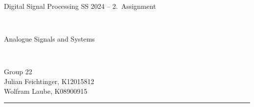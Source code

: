 \documentclass[12pt,a4paper,austrian]{article}
\begin{document}
\pagestyle{plain}


\thispagestyle{empty}
\noindent
\begin{minipage}[b][4cm]{1.0\textwidth}  
\begin{center}
\begin{bf} 
\begin{large} Digital Signal Processing SS 2024 -- 2.~Assignment\end{large} \\
\vspace{0.3cm}
\begin{Large} Analogue Signals and Systems  \end{Large} \\
\vspace{0.3cm}
\end{bf}
\begin{large}
Group 22\\
Julian Feichtinger, K12015812\\
Wolfram Laube, K08900915\\
\end{large} 
\end{center}
\end{minipage}

\noindent \rule[0.8em]{\textwidth}{0.12mm}\\[-0.5em]
\end{document}

